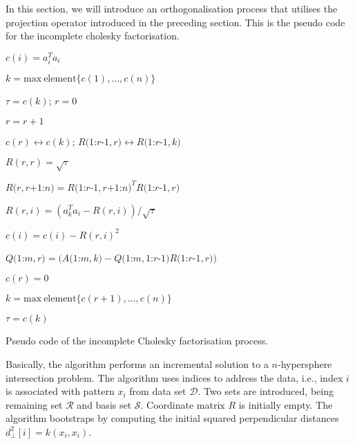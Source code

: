\documentclass{article}
\newcommand{\x}{x}
\newcommand{\coordm}{R}
\begin{document}
In this section, we will introduce an orthogonalisation process that
utilises the projection operator introduced in the preceding
section. This is the pseudo code for the incomplete cholesky factorisation.
%
\begin{algorithm}
\begin{algorithmic}


\STATE $c(i)=a_i^T a_i$

\ENDFOR

\STATE $k = \mathrm{max~element} \{c(1),\ldots,c(n)\}$

\STATE $\tau=c(k)$; $r=0$


\STATE $r=r+1$

\STATE $c(r) \leftrightarrow c(k)$; $R(1$:$r$-$1,r) \leftrightarrow R(1$:$r$-$1,k)$

\STATE $R(r,r) = \sqrt{\tau}$

\STATE $R(r,r$+$1$:$n) = R(1$:$r$-$1,r$+$1$:$n)^T R(1$:$r$-$1,r) $


\STATE $R(r,i) = ( a_k^T a_i - R(r,i) ) / \sqrt{\tau} $

\STATE $c(i) = c(i) - R(r,i)^2$

\ENDFOR


\STATE $Q(1$:$m,r) = ( A(1$:$m,k) - Q(1$:$m,1$:$r$-$1)R( 1$:$r$-$1,r) )$

\ENDIF

\STATE $c(r)= 0 $

\STATE $k = \mathrm{max~element} \{c(r+1),\ldots,c(n)\}$

\STATE $\tau=c(k)$

\ENDWHILE

\end{algorithmic}

\caption{Pseudo code of the incomplete Cholesky factorisation process.}%
\label{algorithm:incomplete_cholesky}
\end{algorithm}


Basically, the algorithm performs an incremental solution to a $n$-hypersphere
intersection problem. The algorithm uses indices to address the data,
i.e., index $i$ is associated with pattern $\x_{i}$ from data set
$\mathcal{D}$. Two sets are introduced, being remaining set $\mathcal{R}$
and basis set $\mathcal{S}$. Coordinate matrix $\coordm$ is initially
empty. The algorithm bootstraps by computing the initial squared perpendicular
distances $d_{\perp}^{2}[i]=k(\x_{i},\x_{i})$. 
\end{document}
